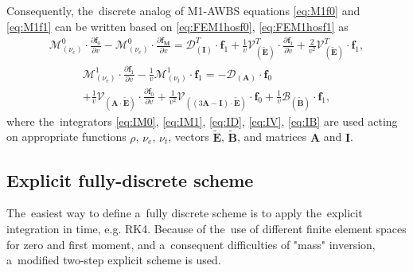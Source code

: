 \documentclass[review]{elsarticle}
\newcommand{\pdv}[2]{\frac{\partial{#1}}{\partial{#2}}}
\newcommand{\vect}[1]{\boldsymbol{#1}}
\newcommand{\matr}[1]{\mathbf{#1}}
\newcommand{\nue}{\nu_{e}}
\newcommand{\nutot}{\nu_{t}}
\newcommand{\vmag}{v}
\newcommand{\tE}{\vect{\tilde{E}}}
\newcommand{\tB}{\vect{\tilde{B}}}
\newcommand{\fM}{f_M}
\newcommand{\vfzero}{\vect{f}_0}
\newcommand{\fone}{\vect{f}_1}
\newcommand{\MI}{\matr{I}}
\newcommand{\MA}{\matr{A}}
\newcommand{\IM}{\boldsymbol{\mathcal{M}}}
\newcommand{\ID}{\boldsymbol{\mathcal{D}}}
\newcommand{\IV}{\boldsymbol{\mathcal{V}}}
\newcommand{\IB}{\boldsymbol{\mathcal{B}}}
\begin{document}
Consequently, the~discrete analog of M1-AWBS equations
\eqref{eq:M1f0} and \eqref{eq:M1f1} can be written based on 
 \eqref{eq:FEM1hosf0}, \eqref{eq:FEM1hosf1} as
\begin{multline}
  \IM^0_{(\nue)} \cdot \pdv{\vfzero}{\vmag} 
  - \IM^0_{(\nue)} \cdot \pdv{\vect{\fM}}{\vmag}
  = 
  \ID^T_{\left(\MI\right)} \cdot \fone
  + \frac{1}{\vmag}\IV^T_{\left(\tE\right)} \cdot 
  \pdv{\fone}{\vmag} 
  + \frac{2}{\vmag^2}\IV^T_{\left(\tE\right)} \cdot \fone ,  
  \label{eq:semiM1hosf0}
\end{multline}
\begin{multline}
  \IM^1_{(\nue)} \cdot \pdv{\fone}{\vmag} 
  - \frac{1}{\vmag}\IM^1_{\left( \nutot \right)} 
  \cdot \fone 
  = 
  - \ID_{\left(\MA\right)}\cdot \vfzero \\ 
  + \frac{1}{\vmag}\IV_{\left(\MA \cdot \tE\right)} \cdot
  \pdv{\vfzero}{\vmag}
  + \frac{1}{\vmag^2}\IV_{\left(\left( 3\MA - \MI \right) \cdot \tE \right)} 
  \cdot \vfzero
  + \frac{1}{\vmag}\IB_{\left( \tB \right)} \cdot \fone ,
  \label{eq:semiM1hosf1}
\end{multline}
where the~integrators \eqref{eq:IM0}, \eqref{eq:IM1},
\eqref{eq:ID}, \eqref{eq:IV}, \eqref{eq:IB} are used acting on appropriate
functions $\rho$, $\nue$, $\nutot$, vectors $\tE$, $\tB$, and matrices $\MA$
and $\MI$.



\subsection{Explicit fully-discrete scheme}\label{sec:expl_fullydiscrete_scheme}
The~easiest way to define a~fully discrete scheme is to apply the~explicit
integration in time, e.g. RK4.
Because of the~use of different finite element spaces for zero and first moment,
and a~consequent difficulties of "mass" inversion, a~modified two-step explicit
scheme is used.
\end{document}
